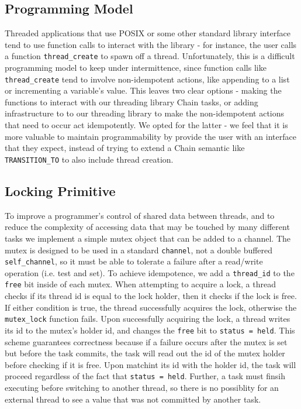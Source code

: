 \documentclass[11pt]{sensys-proc}
\newcommand{\chain}{Chain\xspace}
\begin{document}
\subsection{Programming Model}
Threaded applications that use POSIX or some other standard library interface
tend to use function calls to interact with the library - for instance, the
user calls a function \texttt{thread\_create} to spawn off a thread.
Unfortunately, this is a difficult programming model to keep under
intermittence, since function calls like \texttt{thread\_create} tend to
involve non-idempotent actions, like appending to a list or incrementing a
variable's value. This leaves two clear options - making the functions to
interact with our threading library \chain tasks, or adding infrastructure to
to our threading library to make the non-idempotent actions that need to occur
act idempotently. We opted for the latter - we feel that it is more valuable to
maintain programmability by provide the user with an interface that they
expect, instead of trying to extend a \chain semantic like
\texttt{TRANSITION\_TO} to also include thread creation.

\subsection{Locking Primitive} 
To improve a programmer's control of shared data between threads, and to reduce
the complexity of accessing data that may be touched by many different tasks we
implement a simple mutex object that can be added to a channel. The mutex is
designed to be used in a standard \texttt{channel}, not a double buffered
\texttt{self\_channel}, so it must be able to tolerate a failure after a
read/write operation (i.e. test and set). To achieve idempotence, we add a
\texttt{thread\_id} to the \texttt{free} bit inside of each mutex. When
attempting to acquire a lock, a thread checks if its thread id is equal to the
lock holder, then it checks if the lock is free. If either condition is true,
the thread successfully acquires the lock, otherwise the \texttt{mutex\_lock}
function fails. Upon successfully acquiring the lock, a thread writes its id to
the mutex's holder id, and changes the \texttt{free} bit to \texttt{status =
held}. This scheme guarantees correctness because if a failure occurs after the
mutex is set but before the task commits, the task will read out the id of the
mutex holder before checking if it is free. Upon matchint its id with the holder
id, the task will proceed regardless of the fact that \texttt{status = held}.
Further, a task must finsih executing before switching to another thread, so
there is no possiblity for an external thread to see a value that was not
committed by another task. 
\end{document}

